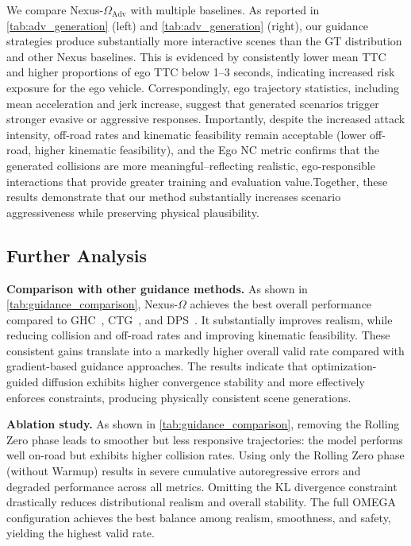 \documentclass[10pt,twocolumn,letterpaper]{article}
\theoremstyle{plain}
\theoremstyle{remark}
\renewcommand{\paragraph}[1]{\vspace{.5em}\noindent\textbf{#1.}}
\begin{document}
We compare Nexus-$\Omega_\mathrm{Adv}$ with multiple baselines. As reported in \cref{tab:adv_generation} (left) and \cref{tab:adv_generation} (right), our guidance strategies produce substantially more interactive scenes than the GT distribution and other Nexus baselines. This is evidenced by consistently lower mean TTC and higher proportions of ego TTC below 1–3 seconds, indicating increased risk exposure for the ego vehicle. Correspondingly, ego trajectory statistics, including mean acceleration and jerk increase, suggest that generated scenarios trigger stronger evasive or aggressive responses. Importantly, despite the increased attack intensity, off-road rates and kinematic feasibility remain acceptable (lower off-road, higher kinematic feasibility), and the Ego NC metric confirms that the generated collisions are more meaningful--reflecting realistic, ego-responsible interactions that provide greater training and evaluation value.Together, these results demonstrate that our method substantially increases scenario aggressiveness while preserving physical plausibility.

\subsection{Further Analysis}

\textbf{Comparison with other guidance methods.}
As shown in \cref{tab:guidance_comparison}, Nexus-$\Omega$ achieves the best overall performance compared to GHC~\cite{jiang2024scenediffuser}, CTG~\cite{zhong2022guided}, and DPS~\cite{zheng2025diffusion}. It substantially improves realism, while reducing collision and off-road rates and improving kinematic feasibility. These consistent gains translate into a markedly higher overall valid rate compared with gradient-based guidance approaches. The results indicate that optimization-guided diffusion exhibits higher convergence stability and more effectively enforces constraints, producing physically consistent scene generations.

\paragraph{Ablation study}
As shown in \cref{tab:guidance_comparison}, removing the Rolling Zero phase leads to smoother but less responsive trajectories: the model performs well on-road but exhibits higher collision rates. Using only the Rolling Zero phase (without Warmup) results in severe cumulative autoregressive errors and degraded performance across all metrics. Omitting the KL divergence constraint drastically reduces distributional realism and overall stability. The full OMEGA configuration achieves the best balance among realism, smoothness, and safety, yielding the highest valid rate. 
\end{document}
